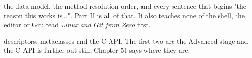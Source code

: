 \documentclass[10pt, twoside, openany]{book}
\begin{document}


\frontmatter
{}


\tableofcontents

\mainmatter

  {the data model, the method resolution order, and every sentence that begins
   "the reason this works is...". Part II is all of that. It also teaches none of the
   shell, the editor or Git: read \textit{Linux and Git from Zero} first.}
%
%
%
%
%
%
%
%
%
%
%
%
%
%
%
%
%

  {descriptors, metaclasses and the C API. The first two are the Advanced stage and
   the C API is further out still. Chapter 51 says where they are.}
%
%
%
%
%
%
%
%
%
%
%
\end{document}
